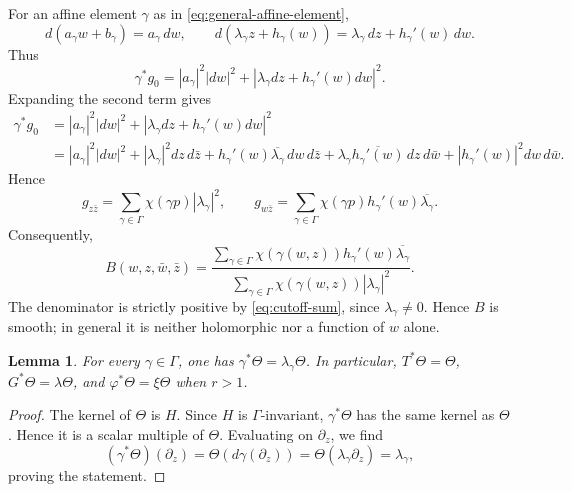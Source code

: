 \documentclass[10pt,a4paper]{amsart}
\numberwithin{equation}{section}
\newtheorem{lema}{Lemma}
\begin{document}
For an affine element $\gamma$ as in \eqref{eq:general-affine-element},
\begin{equation*}
 d(a_\gamma w+b_\gamma)=a_\gamma\,dw,
 \qquad
 d(\lambda_\gamma z+h_\gamma(w))
 =
 \lambda_\gamma\,dz+h_\gamma'(w)\,dw.
\end{equation*}
Thus
$$
\gamma^*g_0=|a_\gamma|^2|dw|^2+|\lambda_\gamma dz+h_\gamma'(w)dw|^2.
$$
Expanding the second term gives
\begin{align*}
\gamma^* g_0 &=
|a_\gamma|^2|dw|^2 + |\lambda_\gamma dz+h_\gamma'(w)dw|^2 \\
&=
|a_\gamma|^2|dw|^2 + |\lambda_\gamma|^2 dz\,d\bar z
+h_\gamma'(w)\overline{\lambda_\gamma}\,dw\,d\bar z
+\lambda_\gamma\overline{h_\gamma'(w)}\,dz\,d\bar w
+|h_\gamma'(w)|^2dw\,d\bar w.
\end{align*}
Hence
\begin{equation*}
 g_{z\bar z}
 =
 \sum_{\gamma\in\Gamma}\chi(\gamma p)|\lambda_\gamma|^2,
 \qquad
 g_{w\bar z}
 =
 \sum_{\gamma\in\Gamma}\chi(\gamma p)h_\gamma'(w)\overline{\lambda_\gamma}.
\end{equation*}
Consequently,
\begin{equation*}
 B(w,z,\bar w,\bar z)
 =
 \frac{
 \displaystyle\sum_{\gamma\in\Gamma}
 \chi(\gamma(w,z))h_\gamma'(w)\overline{\lambda_\gamma}
 }{
 \displaystyle\sum_{\gamma\in\Gamma}
 \chi(\gamma(w,z))|\lambda_\gamma|^2
 }.
\end{equation*}
The denominator is strictly positive by \eqref{eq:cutoff-sum}, since $\lambda_\gamma\ne0$. Hence $B$ is smooth; in general it is neither holomorphic nor a function of $w$ alone.

\begin{lema} \label{lem:Theta-equivariant}
For every $\gamma\in\Gamma$, one has $\gamma^*\Theta=\lambda_\gamma\Theta$. In particular, $T^*\Theta=\Theta$, $G^*\Theta=\lambda\Theta$, and $\varphi^*\Theta=\xi\Theta$ when $r>1$.
\end{lema}

\begin{proof}
The kernel of $\Theta$ is $H$. Since $H$ is $\Gamma$-invariant,
$\gamma^*\Theta$ has the same kernel as $\Theta$. Hence it is a scalar
multiple of $\Theta$. Evaluating on $\partial_z$, we find
\begin{equation*}
 (\gamma^*\Theta)(\partial_z)
 =
 \Theta(d\gamma(\partial_z))
 =
 \Theta(\lambda_\gamma\partial_z)
 =
 \lambda_\gamma,
\end{equation*}
proving the statement.
\end{proof}
\end{document}

